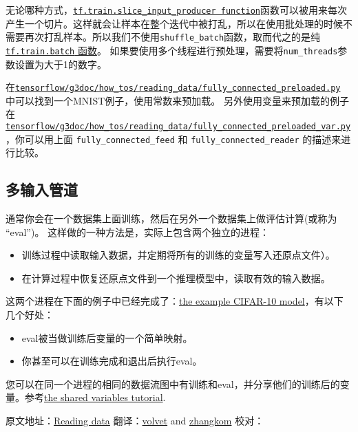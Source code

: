 无论哪种方式，\href{../../api_docs/python/io_ops.md\#slice_input_producer}{\texttt{tf.train.slice\_input\_producer\ function}}函数可以被用来每次产生一个切片。这样就会让样本在整个迭代中被打乱，所以在使用批处理的时候不需要再次打乱样本。所以我们不使用\texttt{shuffle\_batch}函数，取而代之的是纯\href{../../api_docs/python/io_ops.md\#batch}{\texttt{tf.train.batch}
函数}。
如果要使用多个线程进行预处理，需要将\texttt{num\_threads}参数设置为大于1的数字。

在\href{https://tensorflow.googlesource.com/tensorflow/+/master/tensorflow/g3doc/how_tos/reading_data/fully_connected_preloaded.py}{\texttt{tensorflow/g3doc/how\_tos/reading\_data/fully\_connected\_preloaded.py}}
中可以找到一个MNIST例子，使用常数来预加载。
另外使用变量来预加载的例子在\href{https://tensorflow.googlesource.com/tensorflow/+/master/tensorflow/g3doc/how_tos/reading_data/fully_connected_preloaded_var.py}{\texttt{tensorflow/g3doc/how\_tos/reading\_data/fully\_connected\_preloaded\_var.py}}，你可以用上面
\texttt{fully\_connected\_feed} 和 \texttt{fully\_connected\_reader}
的描述来进行比较。

\subsection{多输入管道 }\label{ux591aux8f93ux5165ux7ba1ux9053}

通常你会在一个数据集上面训练，然后在另外一个数据集上做评估计算(或称为
``eval'')。 这样做的一种方法是，实际上包含两个独立的进程：

\begin{itemize}
\tightlist
\item
  训练过程中读取输入数据，并定期将所有的训练的变量写入还原点文件）。
\item
  在计算过程中恢复还原点文件到一个推理模型中，读取有效的输入数据。
\end{itemize}

这两个进程在下面的例子中已经完成了：\href{../../tutorials/deep_cnn/index.md\#save-and-restore-checkpoints}{the
example CIFAR-10 model}，有以下几个好处：

\begin{itemize}
\tightlist
\item
  eval被当做训练后变量的一个简单映射。
\item
  你甚至可以在训练完成和退出后执行eval。
\end{itemize}

您可以在同一个进程的相同的数据流图中有训练和eval，并分享他们的训练后的变量。参考\href{../../how_tos/variable_scope/index.md}{the
shared variables tutorial}.

原文地址：\href{https://github.com/jikexueyuanwiki/tensorflow-zh/blob/master/SOURCE/how_tos/reading_data/index.md}{Reading
data} 翻译：\href{https://github.com/volvet}{volvet} and
\href{https://github.com/zhangkom}{zhangkom} 校对：


